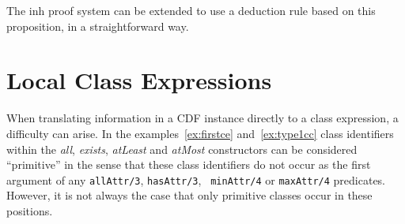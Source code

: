 The {\sc inh} proof system can be extended to use a deduction rule
based on this proposition, in a straightforward way.


\section{Local Class Expressions} \label{sec:lce}

When translating information in a CDF instance directly to a class
expression, a difficulty can arise.  In the examples~\ref{ex:firstce}
and~\ref{ex:type1cc} class identifiers within the {\em all}, {\em
exists}, {\em atLeast} and {\em atMost} constructors can be considered
``primitive'' in the sense that these class identifiers do not occur
as the first argument of any {\tt allAttr/3}, {\tt hasAttr/3}, {\tt
minAttr/4} or {\tt maxAttr/4} predicates.  However, it is not always
the case that only primitive classes occur in these positions.

